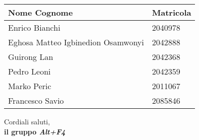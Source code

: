 \documentclass[a4paper, 12pt]{article}
\begin{document}
\begin{table}[H]
    \centering
    \begin{tabular}{| l | l |}
    \hline
    \textbf{Nome Cognome} & 
    \textbf{Matricola}\\ 
        \hline
            Enrico Bianchi&
            2040978 \\
        \hline 
            Eghosa Matteo Igbinedion Osamwonyi&
            2042888 \\
        \hline 
            Guirong Lan&
            2042368 \\
        \hline 
            Pedro Leoni&
            2042359 \\
        \hline 
            Marko Peric&
            2011067 \\
        \hline 
            Francesco Savio&
            2085846 \\
        \hline 
    \end{tabular}
\end{table}
\noindent
Cordiali saluti,\\
\textbf{il gruppo \textit{Alt+F4}}
\end{document}
